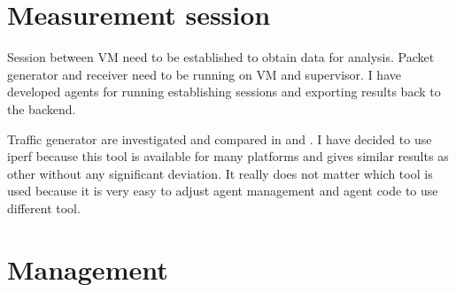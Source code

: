 \section{Measurement session}
Session between \Ac{VM} need to be established to obtain data for analysis. Packet generator and receiver need to be running on \Ac{VM} and supervisor. I have developed agents for running establishing sessions and exporting results back to the backend.

Traffic generator are investigated and compared in \cite{traffic-generators1} and \cite{traffic-generators2}. I have decided to use iperf because this tool is available for many platforms and gives similar results as other without any significant deviation. It really does not matter which tool is used because it is very easy to adjust agent management and agent code to use different tool.

\section{Management}
